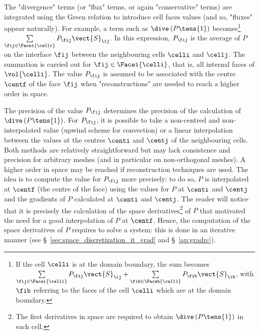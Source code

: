The "divergence" terms (or "flux" terms, or again "conservative"
terms) are integrated using the Green relation to introduce cell faces
values (and so, "fluxes" appear naturally). For example, a term such as 
$\dive \left( P \tens{1}\right)$ becomes\footnote{
If the cell $\celli$ is at the domain boundary, the sum becomes 
$\sum\limits_{\fij \in \Facei{\celli}} P_{\fij} \vect{S}_{\ij}+\sum\limits_{\fib \in \Faceb{\celli}} P_{\fib} \vect{S}_{\ib}$, 
with $\fib$ referring to the faces
of the cell $\celli$ which are at the domain boundary.
} 
$\sum\limits_{\fij \in \Facei{\celli}} P_{\fij}\vect{S}_{\ij}$.
In this expression, $P_{\fij}$
is the average of $P$ on the interface $\fij$ between the neighbouring cells $\celli$
and $\cellj$. The summation is carried out for $\fij \in \Facei{\celli}$, that is, all
internal faces of $\vol{\celli}$. The value $P_{\fij}$ is
assumed to be associated with the centre $\centf$
 of the face $\fij$ when
"reconstructions" are needed to reach a higher order in space.

The precision of the value $P_{\fij}$ determines the precision of the
calculation of $\dive \left(P \tens{1}\right)$. For $P_{\fij}$, it is possible to take a non-centred
and non-interpolated value (upwind scheme for convection) or a linear
interpolation between the values at the centres $\centi$ and $\centj$ of the neighbouring
cells. Both methods are relatively straightforward but may lack consistence
and precision for arbitrary meshes (and in particular on non-orthogonal
meshes). A higher order in space may be reached if reconstruction techniques
are used. The idea is to compute the value for $P_{\fij}$ more precisely: to
do so, $P$ is interpolated at $\centf$ (the centre of the face) using the
values for $P$ at $\centi$ and $\centj$ and the gradients of $P$ calculated at $\centi$ and $\centj$.
The reader will notice that it is precisely the calculation of the space
derivatives\footnote{%
The first derivatives in space are required to obtain $\dive \left(P \tens{1}\right)$ in each cell.}
of $P$ that motivated the need for a good interpolation of $P$ at $\centf$.
Hence, the computation of the space derivatives of $P$ requires to solve a
system: this is done in an iterative manner (see \S~\ref{sec:space_discretization_it_grad} and \S~\ref{ap:gradrc}).

